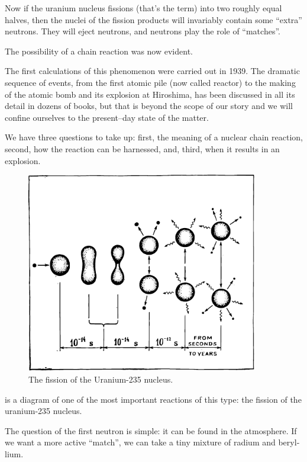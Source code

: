 Now if the uranium nucleus fissions (that’s the term) into two roughly equal halves, then the nuclei of the fission products will invariably contain some ``extra'' neutrons. They will eject neutrons, and neutrons play the role of ``matches''. 

The possibility of a chain reaction was now evident.

The first calculations of this phenomenon were carried out in 1939. The dramatic sequence of events, from the first atomic pile (now called reactor) to the making of the atomic bomb and its explosion at Hiroshima, has been discussed in all its detail in dozens of books, but that is beyond the scope of our story and we will confine ourselves to the present--day state of the matter.

We have three questions to take up: first, the meaning of a nuclear chain reaction, second, how the reaction can be harnessed, and, third, when it results in an explosion.

\begin{figure}[!ht]
\centering
\includegraphics[width=0.9\textwidth]{figures/fig-05-06.pdf}
\caption{The fission of the Uranium-235 nucleus.}
\label{fig-5.6}
\end{figure}

 is a diagram of one of the most important reactions of this type: the fission of the uranium-235 nucleus. 

The question of the first neutron is simple: it can be found in the atmosphere. If we want a more active ``match'', we can take a tiny mixture of radium and beryl­lium.

